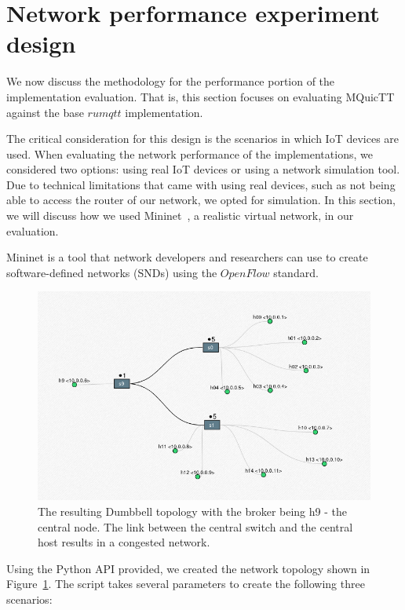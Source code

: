 \section{Network performance experiment design} \label{chap:net_sim}

We now discuss the methodology for the performance portion of the implementation evaluation.
That is, this section focuses on evaluating MQuicTT against the base $rumqtt$ implementation.

The critical consideration for this design is the scenarios in which IoT devices are used.
When evaluating the network performance of the implementations, we considered two options: using real IoT devices or using a network simulation tool.
Due to technical limitations that came with using real devices, such as not being able to access the router of our network, we opted for simulation.
In this section, we will discuss how we used Mininet~\citep{lantz_mininet_2021}, a realistic virtual network, in our evaluation.

Mininet is a tool that network developers and researchers can use to create software-defined networks (SNDs) using the $OpenFlow$ standard.

\begin{figure}[ht]
    \centering
    \includegraphics[width=0.9\linewidth]{images/mininet_topo.png}
    \caption{The resulting Dumbbell topology with the broker being h9 - the central node. The link between the central switch and the central host results in a congested network.}
    \label{fig:mininet-topo}
\end{figure}

Using the Python API provided, we created the network topology shown in Figure~\ref{fig:mininet-topo}.
The script takes several parameters to create the following three scenarios:

